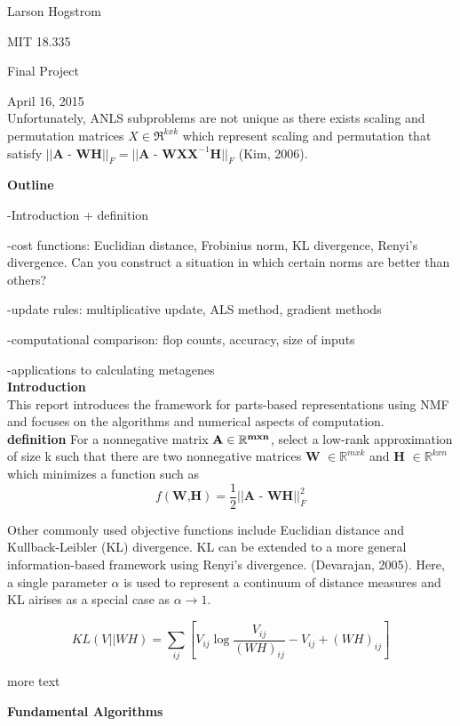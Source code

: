 \documentclass[12pt]{article}
\begin{document}
Larson Hogstrom 

MIT 18.335

Final Project

April 16, 2015 \\

Unfortunately, ANLS subproblems are not unique as there exists scaling and permutation matrices $ X \in \Re^{kxk} $ which represent scaling and permutation that satisfy $ || \textbf{A - WH} ||_{F} = || \textbf{A - WXX}^{-1} \textbf{H} ||_{F} $ (Kim, 2006).  

\textbf{Outline}

-Introduction + definition

-cost functions: Euclidian distance, Frobinius norm, KL divergence, Renyi's divergence. Can you construct a situation in which certain norms are better than others?

-update rules: multiplicative update, ALS method, gradient methods

-computational comparison: flop counts, accuracy, size of inputs

-applications to calculating metagenes \\

\textbf{Introduction} \\
This report introduces the framework for parts-based representations using NMF and focuses on the algorithms and numerical aspects of computation. \\

\textbf{definition} For a nonnegative matrix $\bf{A} \in \mathbb{R}^{m x n}$, select a low-rank approximation of size k such that there are two nonnegative matrices \textbf{W} $ \in \mathbb{R}^{m x k}$ and \textbf{H} $ \in \mathbb{R}^{k x n}$ which minimizes a function such as 
$$ f( \textbf{W,H}) = \frac{1}{2} || \textbf{A - WH} || ^{2}_{F}$$


Other commonly used objective functions include Euclidian distance and Kullback-Leibler (KL) divergence. KL can be extended to a more general information-based framework using Renyi's divergence. (Devarajan, 2005). Here, a single parameter $\alpha$ is used to represent a continuum of distance measures and KL airises as a special case as $\alpha \to 1$. 

$$ KL(V || WH) = \sum_{ij}{[V_{ij} \log{ \frac{V_{ij}}{(WH)_{ij}} - V_{ij} + (WH)_{ij}} ]} $$

more text

\pagebreak 

\textbf{Fundamental Algorithms} \\
\end{document}
